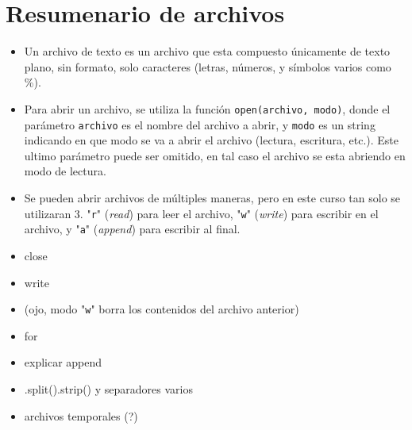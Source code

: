\section*{Resumenario de archivos}

\begin{itemize}
    \item Un archivo de texto es un archivo que esta compuesto únicamente de texto plano, sin formato, solo caracteres (letras, números, y símbolos varios como \%).

    \item Para abrir un archivo, se utiliza la función \texttt{open(archivo, modo)}, donde el parámetro \texttt{archivo} es el nombre del archivo a abrir, y \texttt{modo} es un string indicando en que modo se va a abrir el archivo (lectura, escritura, etc.). Este ultimo parámetro puede ser omitido, en tal caso el archivo se esta abriendo en modo de lectura.
    
    \item Se pueden abrir archivos de múltiples maneras, pero en este curso tan solo se utilizaran 3. "\texttt{r}" (\textit{read}) para leer el archivo, "\texttt{w}" (\textit{write}) para escribir en el archivo, y "\texttt{a}" (\textit{append}) para escribir al final.
    
    \item close
    
    \item write
    
    \item (ojo, modo "\texttt{w}" borra los contenidos del archivo anterior)
    
    \item for
    
    \item explicar append
    
    \item .split().strip() y separadores varios
    
    \item archivos temporales (?)
    
\end{itemize}
